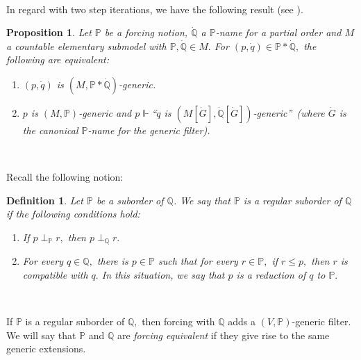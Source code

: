 \documentclass{article}
\newtheorem{definition}[theorem]{Definition}
\newtheorem{proposition}[theorem]{Proposition}
\begin{document}
\qquad\ \qquad\ \ 

In regard with two step iterations, we have the following result (see
\cite{AbrahamHandbook}).

\begin{proposition}
Let $\mathbb{P}$ be a forcing notion, $\mathbb{\dot{Q}}$ a $\mathbb{P}$-name
for a partial order and $M$ a countable elementary submodel with
$\mathbb{P},\mathbb{\dot{Q}}\in M.$ For $(p,\dot{q})\in\mathbb{P}%
\ast\mathbb{\dot{Q}},$ the following are equivalent:
\label{prop iteracion gen}

\begin{enumerate}
\item $(p,\dot{q})$ is $(M,\mathbb{P}\ast\mathbb{\dot{Q}})$-generic.

\item $p$ is $(M,\mathbb{P})$-generic and $p\Vdash$\textquotedblleft$\dot{q}$
is $(M[\dot{G}],\mathbb{\dot{Q}}[\dot{G}])$-generic\textquotedblright\ (where
$\dot{G}$ is the canonical $\mathbb{P}$-name for the generic filter).
\end{enumerate}
\end{proposition}

\qquad\ \qquad\ \ \ \qquad\ \ 

Recall the following notion:

\begin{definition}
Let $\mathbb{P}$ be a suborder of $\mathbb{Q}$. We say that $\mathbb{P}$
\emph{is a regular suborder of }$\mathbb{Q}$ if the following conditions hold:

\begin{enumerate}
\item If $p\perp_{\mathbb{P}}r,$ then $p\perp_{\mathbb{Q}}r.$

\item For every $q\in\mathbb{Q},$ there is $p\in\mathbb{P}$ such that for
every $r\in\mathbb{P},$ if $r\leq p,$ then $r$ is compatible with $q.$ In this
situation, we say that $p$ is a reduction of $q$ to $\mathbb{P}.$
\end{enumerate}
\end{definition}

\qquad\ \qquad\ \ \ \ 

If $\mathbb{P}$ is a regular suborder of $\mathbb{Q},$ then forcing with
$\mathbb{Q}$ adds a $(V,\mathbb{P})$-generic filter. We will say that
$\mathbb{P}$ and $\mathbb{Q}$ are \emph{forcing equivalent }if they give rise
to the same generic extensions.
\end{document}
